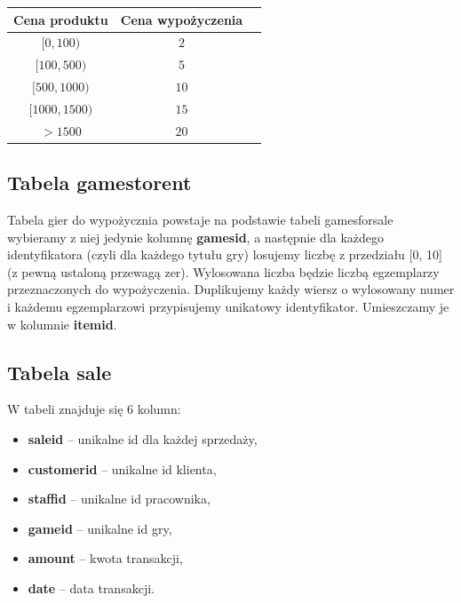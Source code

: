 \documentclass{article}
\begin{document}
	\begin{center}\centering
		\begin{tabular}{|c|c|c|}
			\hline
			\textbf{Cena produktu} & \textbf{Cena wypożyczenia}\\
			\hline
			$[0, 100)$ & $2$\\
			\hline
			$[100, 500)$ & $5$\\
			\hline
			$[500, 1000)$ & $10$\\
			\hline
			$[1000, 1500)$ & $15$\\
			\hline
			$>1500$ & $20$\\
			\hline
		\end{tabular}
	\end{center}
	
	
	
	\subsection{Tabela games\textunderscore to\textunderscore rent}
	Tabela gier do wypożycznia powstaje na podstawie tabeli games\textunderscore for\textunderscore sale wybieramy z niej jedynie kolumnę \textbf{games\textunderscore id}, a następnie dla każdego identyfikatora (czyli dla każdego tytułu gry) losujemy liczbę z przedziału [0, 10] (z pewną ustaloną przewagą zer). Wylosowana liczba będzie liczbą egzemplarzy przeznaczonych do wypożyczenia. Duplikujemy każdy wiersz o wylosowany numer i każdemu egzemplarzowi przypisujemy unikatowy identyfikator. Umieszczamy je w kolumnie \textbf{item\textunderscore id}.
	
	\subsection{Tabela sale}
		W tabeli znajduje się 6 kolumn:
		\begin{itemize}
			\setlength{\itemsep}{-2pt}
			\item \textbf{sale\textunderscore id} – unikalne id dla każdej sprzedaży,
			\item \textbf{customer\textunderscore id} – unikalne id klienta,
			\item \textbf{staff\textunderscore id} – unikalne id pracownika,
			\item \textbf{game\textunderscore id} – unikalne id gry,
			\item \textbf{amount} – kwota transakcji,
			\item \textbf{date} – data transakcji.
		\end{itemize}
\end{document}
